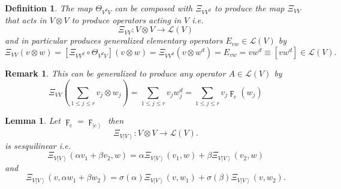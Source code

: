 \documentclass[aps,preprint]{revtex4}%
\newtheorem{definition}[theorem]{Definition}
\newtheorem{lemma}[theorem]{Lemma}
\newtheorem{remark}[theorem]{Remark}
\begin{document}
\begin{definition}
The map $\Theta_{V^{d}V}$ can be composed with $\Xi_{VV^{d}}$ to produce the
map $\Xi_{VV}$ that acts in $V\otimes V$ to produce operators acting in $V$
i.e.
\begin{equation}
\Xi_{VV}:V\otimes V\rightarrow\mathcal{L}\left(  V\right)
\end{equation}
and in particular produces generalized elementary operators $E_{vw}%
\in\mathcal{L}\left(  V\right)  $ by
\begin{equation}
\Xi_{VV}\left(  v\otimes w\right)  =\left[  \Xi_{VV^{d}}\circ\Theta_{V^{d}%
V}\right]  \left(  v\otimes w\right)  =\Xi_{VV^{d}}\left(  v\otimes
w^{d}\right)  =E_{vw}=vw^{d}\equiv\left[  vw^{d}\right]  \in\mathcal{L}\left(
V\right)  .
\end{equation}

\end{definition}

\begin{remark}
This can be generalized to produce \emph{any} operator $A\in\mathcal{L}\left(
V\right)  $ by
\begin{equation}
\Xi_{VV}\left(  \sum_{1\leq j\leq r}v_{j}\otimes w_{j}\right)  =\sum_{1\leq
j\leq r}v_{j}w_{j}^{d}=\sum_{1\leq j\leq r}v_{j}\digamma_{e}\left(
w_{j}\right)
\end{equation}

\end{remark}

\begin{lemma}
Let $\digamma_{e}=\digamma_{\left\vert e\right\rangle }$ then
\begin{equation}
\Xi_{V\left\vert V\right\rangle }:V\otimes V\rightarrow\mathcal{L}\left(
V\right)  .
\end{equation}
is \emph{sesquilinear} i.e.
\begin{equation}
\Xi_{V\left\vert V\right\rangle }\left(  \alpha v_{1}+\beta v_{2},w\right)
=\alpha\Xi_{V\left\vert V\right\rangle }\left(  v_{1},w\right)  +\beta
\Xi_{V\left\vert V\right\rangle }\left(  v_{2},w\right)
\end{equation}
and%
\begin{equation}
\Xi_{V\left\vert V\right\rangle }\left(  v,\alpha w_{1}+\beta w_{2}\right)
=\sigma\left(  \alpha\right)  \Xi_{V\left\vert V\right\rangle }\left(
v,w_{1}\right)  +\sigma\left(  \beta\right)  \Xi_{V\left\vert V\right\rangle
}\left(  v,w_{2}\right)  .
\end{equation}

\end{lemma}
\end{document}
